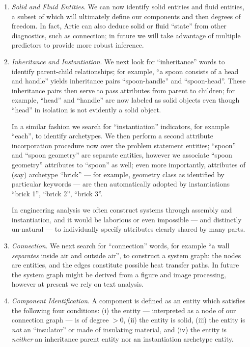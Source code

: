\documentclass[preprint,12pt]{article}
\begin{document}
\begin{enumerate}
\item {\em Solid and Fluid Entities}. We can now identify solid entities and fluid entities, a subset of which will ultimately define our components and then degrees of freedom. In fact, Artie can also deduce solid or fluid ``state'' from other diagnostics, such as connection; in future we will take advantage of multiple predictors to provide more robust inference.

\item {\em Inheritance and Instantiation}. We next look for ``inheritance'' words to identify parent-child relationships; for example, ``a spoon consists of a head and handle'' yields inheritance pairs ``spoon-handle'' and ``spoon-head''. These inheritance pairs then serve to pass attributes from parent to children; for example, ``head'' and ``handle'' are now labeled as solid objects even though ``head'' in isolation is not evidently a solid object. 

In a similar fashion we search for ``instantiation'' indicators, for example ``each'', to identify archetypes. We then perform a second attribute incorporation procedure now over the problem statement entities; ``spoon'' and ``spoon geometry'' are separate entities, however we associate ``spoon geometry'' attributes to ``spoon'' as well; even more importantly, attributes of (say) archetype ``brick'' --- for example, geometry class as identified by particular keywords --- are then automatically adopted by instantiations ``brick 1'', ``brick 2'', ``brick 3''. 

In engineering analysis we often construct systems through assembly and instantiation, and it would be laborious or even impossible --- and distinctly un-natural --- to  individually specify attributes clearly shared by many parts.

\item{\em Connection}. We next search for ``connection'' words, for example ``a wall {\em separates} inside air and outside air'', to construct a system graph: the nodes are entities, and the edges constitute possible heat transfer paths. In future the system graph might be derived from a figure and image processing, however at present we rely on text analysis. 

\item {\em Component Identification}. A  component is defined as an entity which satisfies the following four conditions: (i) the entity --- interpreted as a node of our connection graph --- is of degree $> 0$, (ii) the entity is solid, (iii) the entity is {\em not} an ``insulator'' or made of insulating material, and (iv) the entity is {\em neither} an inheritance parent entity {\rm nor} an instantiation archetype entity.


\end{enumerate}
\end{document}
